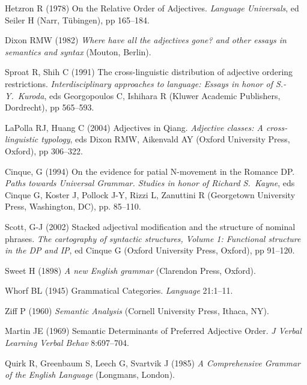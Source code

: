 \documentclass{pnastwo}
\begin{document}
\begin{article}
\begin{thebibliography}{10}
	Hetzron R (1978) On the Relative Order of Adjectives. \emph{Language Universals}, ed Seiler H (Narr, T\"{u}bingen), pp 165--184.
	
	Dixon RMW (1982) \emph{Where have all the adjectives gone? and other essays in semantics and syntax} (Mouton, Berlin).
	
	Sproat R, Shih C (1991) The cross-linguistic distribution of adjective ordering restrictions. \emph{Interdisciplinary approaches to language: Essays in honor of S.-Y.~Kuroda}, eds 
	Georgopoulos C, Ishihara R (Kluwer Academic Publishers, Dordrecht), pp 565--593.

	LaPolla RJ, Huang C (2004) Adjectives in Qiang. \emph{Adjective classes: A cross-linguistic typology}, eds Dixon RMW, Aikenvald AY (Oxford University Press, Oxford), pp 306--322.

	Cinque, G (1994) On the evidence for patial N-movement in the Romance DP. \emph{Paths towards Universal Grammar. Studies in honor of Richard S.~Kayne}, eds Cinque G, Koster J, Pollock J-Y, Rizzi L, Zanuttini R (Georgetown University Press, Washington, DC), pp. 85--110.

	Scott, G-J (2002) Stacked adjectival modification and the structure of nominal phrases. \emph{The cartography of syntactic structures, Volume 1: Functional structure in the DP and IP}, ed Cinque G (Oxford University Press, Oxford), pp 91--120.

	Sweet H (1898) \emph{A new English grammar} (Clarendon Press, Oxford).
		
		
	Whorf BL (1945) Grammatical Categories. \emph{Language} 21:1--11. 
	
	Ziff P (1960) \emph{Semantic Analysis} (Cornell University Press, Ithaca, NY).
		
				
	Martin JE (1969) Semantic Determinants of Preferred Adjective Order. \emph{J Verbal Learning Verbal Behav} 8:697--704. 	
	
	
	
	Quirk R, Greenbaum S, Leech G, Svartvik J (1985) \emph{A Comprehensive Grammar of the English Language} (Longmans, London).
	

\end{thebibliography}
\end{article}
\end{document}
